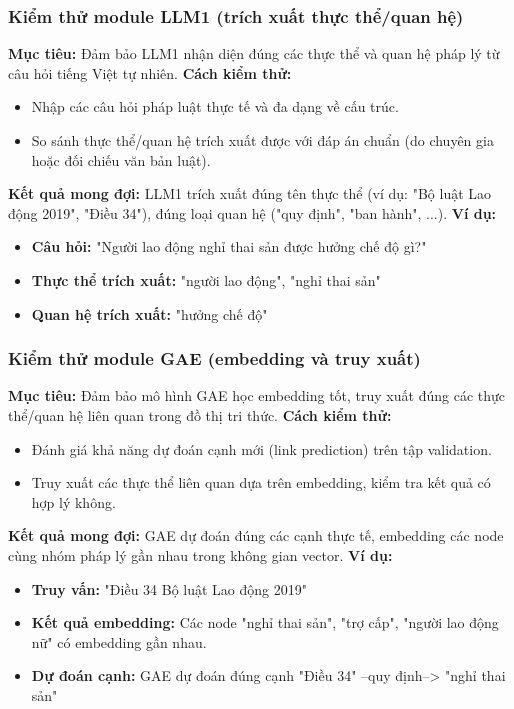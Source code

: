 \documentclass[a4paper]{article}
\begin{document}
\subsubsection{Kiểm thử module LLM1 (trích xuất thực thể/quan hệ)}
\textbf{Mục tiêu:} Đảm bảo LLM1 nhận diện đúng các thực thể và quan hệ pháp lý từ câu hỏi tiếng Việt tự nhiên.
\textbf{Cách kiểm thử:}
\begin{itemize}
\item Nhập các câu hỏi pháp luật thực tế và đa dạng về cấu trúc.
\item So sánh thực thể/quan hệ trích xuất được với đáp án chuẩn (do chuyên gia hoặc đối chiếu văn bản luật).
\end{itemize}
\textbf{Kết quả mong đợi:} LLM1 trích xuất đúng tên thực thể (ví dụ: "Bộ luật Lao động 2019", "Điều 34"), đúng loại quan hệ ("quy định", "ban hành", ...).
\textbf{Ví dụ:}
\begin{itemize}
\item \textbf{Câu hỏi:} "Người lao động nghỉ thai sản được hưởng chế độ gì?"
\item \textbf{Thực thể trích xuất:} "người lao động", "nghỉ thai sản"
\item \textbf{Quan hệ trích xuất:} "hưởng chế độ"
\end{itemize}
\subsubsection{Kiểm thử module GAE (embedding và truy xuất)}
\textbf{Mục tiêu:} Đảm bảo mô hình GAE học embedding tốt, truy xuất đúng các thực thể/quan hệ liên quan trong đồ thị tri thức.
\textbf{Cách kiểm thử:}
\begin{itemize}
\item Đánh giá khả năng dự đoán cạnh mới (link prediction) trên tập validation.
\item Truy xuất các thực thể liên quan dựa trên embedding, kiểm tra kết quả có hợp lý không.
\end{itemize}
\textbf{Kết quả mong đợi:} GAE dự đoán đúng các cạnh thực tế, embedding các node cùng nhóm pháp lý gần nhau trong không gian vector.
\textbf{Ví dụ:}
\begin{itemize}
\item \textbf{Truy vấn:} "Điều 34 Bộ luật Lao động 2019"
\item \textbf{Kết quả embedding:} Các node "nghỉ thai sản", "trợ cấp", "người lao động nữ" có embedding gần nhau.
\item \textbf{Dự đoán cạnh:} GAE dự đoán đúng cạnh "Điều 34" --quy định--> "nghỉ thai sản"
\end{itemize}
\end{document}
